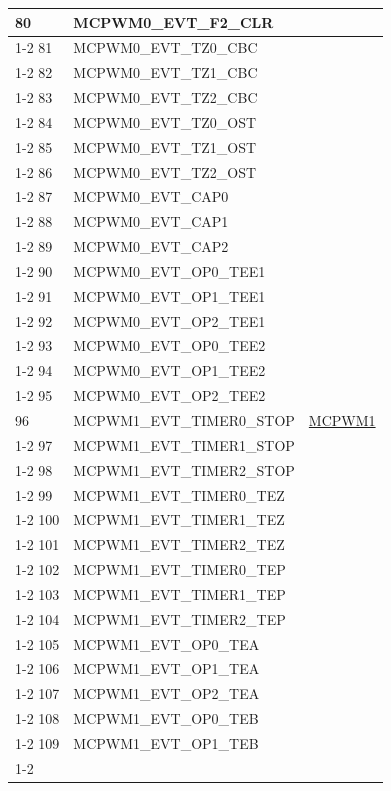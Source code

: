 \documentclass[main\_\_EN.tex]{subfiles}
\begin{document}
\begin{longtable}{ | l | l | l | }
80  & MCPWM0\_EVT\_F2\_CLR  & \\ \cline{1-2}
81  & MCPWM0\_EVT\_TZ0\_CBC & \\ \cline{1-2}
82  & MCPWM0\_EVT\_TZ1\_CBC & \\ \cline{1-2}
83  & MCPWM0\_EVT\_TZ2\_CBC & \\ \cline{1-2}
84  & MCPWM0\_EVT\_TZ0\_OST & \\ \cline{1-2}
85  & MCPWM0\_EVT\_TZ1\_OST & \\ \cline{1-2}
86  & MCPWM0\_EVT\_TZ2\_OST & \\ \cline{1-2}
87  & MCPWM0\_EVT\_CAP0   & \\ \cline{1-2}
88  & MCPWM0\_EVT\_CAP1   & \\ \cline{1-2}
89  & MCPWM0\_EVT\_CAP2   & \\ \cline{1-2}
90  & MCPWM0\_EVT\_OP0\_TEE1   & \\ \cline{1-2}
91  & MCPWM0\_EVT\_OP1\_TEE1   & \\ \cline{1-2}
92  & MCPWM0\_EVT\_OP2\_TEE1   & \\ \cline{1-2}
93  & MCPWM0\_EVT\_OP0\_TEE2   & \\ \cline{1-2}
94  & MCPWM0\_EVT\_OP1\_TEE2   & \\ \cline{1-2}
95  & MCPWM0\_EVT\_OP2\_TEE2   & \\ \hline
96  & MCPWM1\_EVT\_TIMER0\_STOP  & \hyperref[mod:mcpwm]{MCPWM1}\\ \cline{1-2}
97  & MCPWM1\_EVT\_TIMER1\_STOP  & \\ \cline{1-2}
98  & MCPWM1\_EVT\_TIMER2\_STOP  & \\ \cline{1-2}
99  & MCPWM1\_EVT\_TIMER0\_TEZ   & \\ \cline{1-2}
100  & MCPWM1\_EVT\_TIMER1\_TEZ   & \\ \cline{1-2}
101  & MCPWM1\_EVT\_TIMER2\_TEZ   & \\ \cline{1-2}
102  & MCPWM1\_EVT\_TIMER0\_TEP   & \\ \cline{1-2}
103  & MCPWM1\_EVT\_TIMER1\_TEP   & \\ \cline{1-2}
104  & MCPWM1\_EVT\_TIMER2\_TEP   & \\ \cline{1-2}
105  & MCPWM1\_EVT\_OP0\_TEA & \\ \cline{1-2}
106  & MCPWM1\_EVT\_OP1\_TEA & \\ \cline{1-2}
107  & MCPWM1\_EVT\_OP2\_TEA & \\ \cline{1-2}
108  & MCPWM1\_EVT\_OP0\_TEB & \\ \cline{1-2}
109  & MCPWM1\_EVT\_OP1\_TEB & \\ \cline{1-2}

\end{longtable}
\end{document}
